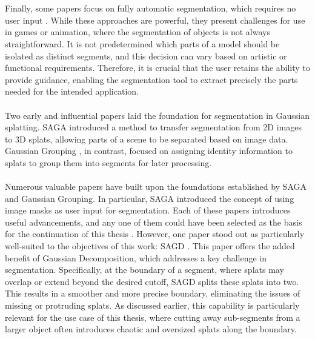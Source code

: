 \documentclass[12pt]{article}
\begin{document}
\\\\
Finally, some papers focus on fully automatic segmentation, which requires no user input \parencite{automatic}. While these approaches are powerful, they present challenges for use in games or animation, where the segmentation of objects is not always straightforward. It is not predetermined which parts of a model should be isolated as distinct segments, and this decision can vary based on artistic or functional requirements. Therefore, it is crucial that the user retains the ability to provide guidance, enabling the segmentation tool to extract precisely the parts needed for the intended application.
\\\\
Two early and influential papers laid the foundation for segmentation in Gaussian splatting. SAGA \parencite{saga} introduced a method to transfer segmentation from 2D images to 3D splats, allowing parts of a scene to be separated based on image data. Gaussian Grouping \parencite{grouping}, in contrast, focused on assigning identity information to splats to group them into segments for later processing.
\\\\
Numerous valuable papers have built upon the foundations established by SAGA and Gaussian Grouping. In particular, SAGA introduced the concept of using image masks as user input for segmentation. Each of these papers introduces useful advancements, and any one of them could have been selected as the basis for the continuation of this thesis \parencite{other1,other2,other3,other4}. However, one paper stood out as particularly well-suited to the objectives of this work: SAGD \parencite{SAGD}. This paper offers the added benefit of Gaussian Decomposition, which addresses a key challenge in segmentation. Specifically, at the boundary of a segment, where splats may overlap or extend beyond the desired cutoff, SAGD splits these splats into two. This results in a smoother and more precise boundary, eliminating the issues of missing or protruding splats. As discussed earlier, this capability is particularly relevant for the use case of this thesis, where cutting away sub-segments from a larger object often introduces chaotic and oversized splats along the boundary.
\end{document}
